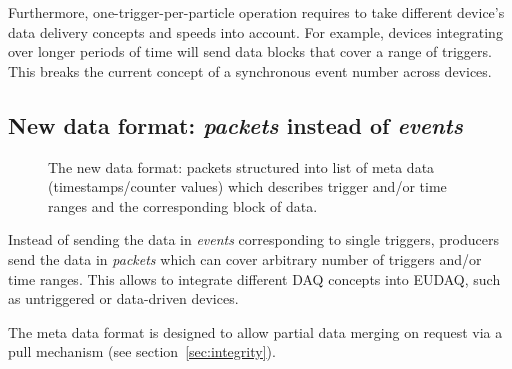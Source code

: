\documentclass[paper=a4, fontsize=11pt, titlepage]{scrartcl}	%
\numberwithin{equation}{section}		%
\numberwithin{figure}{section}			%
\numberwithin{table}{section}           	%
\begin{document}
Furthermore, one-trigger-per-particle operation requires to take
different device's data delivery concepts and speeds into
account. For example, devices integrating over longer periods of time
will send data blocks that cover a range of triggers. This breaks the
current concept of a synchronous event number across devices.

\subsection{New data format: \emph{packets} instead of \emph{events}}
\label{sec:event}

\begin{figure}[htbp]
  \centering
  
  \caption{The new data format: packets structured into list of meta
    data (timestamps/counter values) which describes trigger and/or
    time ranges and the corresponding block of data.}
\label{fig:packetformat}
\end{figure}

Instead of sending the data in \emph{events} corresponding to single
triggers, producers send the data in \emph{packets} which can cover
arbitrary number of triggers and/or time ranges. This allows to
integrate different DAQ concepts into EUDAQ, such as untriggered or
data-driven devices.

The meta data format is designed to allow partial data merging on
request via a pull mechanism (see section~\ref{sec:integrity}).
\end{document}
